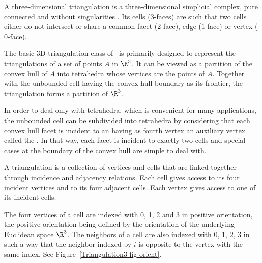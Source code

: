 


A three-dimensional triangulation is a three-dimensional simplicial
complex, pure connected and without singularities \cite{by-ag-98}. Its
cells ($3$-faces) are such that two cells either do not intersect or
share a common facet ($2$-face), edge ($1$-face) or vertex ($0$-face).

The basic 3D-triangulation class of \cgal\ is primarily designed to
represent the triangulations of a set of points $A$ in $\R^3$.  It can
be viewed as a partition of the convex hull of {$A$} into tetrahedra
whose vertices are the points of {$A$}.  Together with the unbounded
cell having the convex hull boundary as its frontier, the triangulation
forms a partition of $\R^3$.

In order to deal
only with tetrahedra, which is convenient for many applications, the
unbounded cell can be subdivided into tetrahedra by considering that
each convex hull facet is incident to an  having as
fourth vertex an auxiliary vertex called the .  In
that way, each facet is incident to exactly two cells and special cases
at the boundary of the convex hull are simple to deal with.


A triangulation is a collection of vertices and cells that are linked
together through incidence and adjacency relations. Each cell gives
access to its four incident vertices and to its four adjacent
cells. Each vertex gives access to one of its incident cells.

The four vertices of a cell are indexed with 0, 1, 2 and 3 in positive
orientation, the positive orientation being defined by the orientation
of the underlying Euclidean space $\R^3$. The neighbors of a cell are also
indexed with 0, 1, 2, 3 in such a way that the neighbor indexed by $i$
is opposite to the vertex with the same index. See
Figure~\ref{Triangulation3-fig-orient}.


